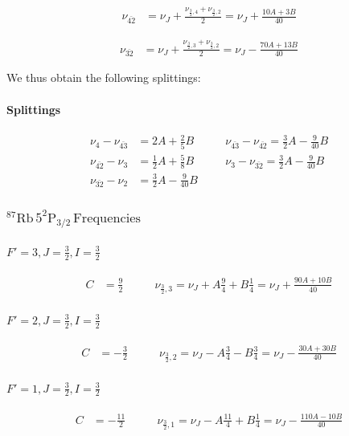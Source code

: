 \documentclass[12pt]{article}
\begin{document}
\begin{align*}
\nu_{\bar{42}} &= \nu_J + \frac{\nu_{\frac{3}{2},4} + \nu_{\frac{3}{2},2}}{2} = \nu_J + \frac{10A+3B}{40}
\end{align*}

\begin{align*}
\nu_{\bar{32}} &= \nu_J + \frac{\nu_{\frac{3}{2},3} + \nu_{\frac{3}{2},2}}{2} = \nu_J - \frac{70A+13B}{40}
\end{align*}

We thus obtain the following splittings:
\paragraph{Splittings}
\begin{align*}
	\nu_{4}-\nu_{\bar{43}} &= 2A+\frac{2}{5}B\qquad & \nu_{\bar{43}}-\nu_{\bar{42}}= \frac{3}{2}A-\frac{9}{40}B\\
	\nu_{\bar{42}}-\nu_{3} &= \frac{1}{2}A+\frac{5}{8}B\qquad & \nu_{3}-\nu_{\bar{32}}= \frac{3}{2}A-\frac{9}{40}B\\
	\nu_{\bar{32}}-\nu_2 &= \frac{3}{2}A-\frac{9}{40}B
\end{align*}


\subsubsection*{${}^{87}\text{Rb}\,5^2\text{P}_{3/2}\,\text{Frequencies}$}

\paragraph{$F' = 3, J = \frac{3}{2}, I = \frac{3}{2}$}
\begin{align*}
C &= \frac{9}{2}\qquad
&\nu_{\frac{3}{2},3} = \nu_J + A \frac{9}{4} + B\frac{1}{4}= \nu_J +  \frac{90A+10B}{40}
\end{align*}

\paragraph{$F' = 2, J = \frac{3}{2}, I = \frac{3}{2}$}
\begin{align*}
C &= -\frac{3}{2}\qquad
&\nu_{\frac{3}{2},2} = \nu_J - A \frac{3}{4} - B\frac{3}{4}= \nu_J - \frac{30A+30B}{40}
\end{align*}

\paragraph{$F' = 1, J = \frac{3}{2}, I = \frac{3}{2}$}
\begin{align*}
C &= -\frac{11}{2}\qquad
&\nu_{\frac{3}{2},1} = \nu_J - A \frac{11}{4} + B\frac{1}{4} = \nu_J - \frac{110A-10B}{40}
\end{align*}
\end{document}
